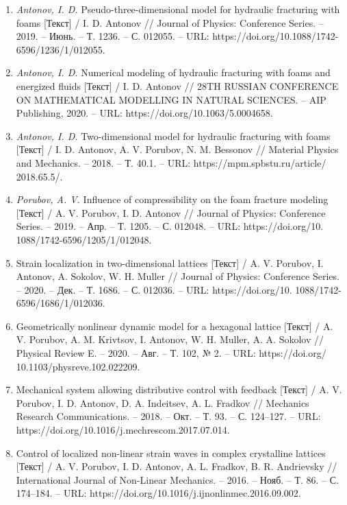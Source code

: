 \begin{enumerate}
\item \textit{Antonov, I. D.} Pseudo-three-dimensional model for hydraulic fracturing with
foams [Текст] / I. D. Antonov // Journal of Physics: Conference Series. --
2019. -- Июнь. -- Т. 1236. -- С. 012055. -- URL: https://doi.org/10.1088/1742-
6596/1236/1/012055.

\item \textit{Antonov, I. D.} Numerical modeling of hydraulic fracturing with foams and
energized fluids [Текст] / I. D. Antonov // 28TH RUSSIAN CONFERENCE
ON MATHEMATICAL MODELLING IN NATURAL SCIENCES. -- AIP
Publishing, 2020. -- URL: https://doi.org/10.1063/5.0004658.

\item \textit{Antonov, I. D.} Two-dimensional model for hydraulic fracturing with foams
[Текст] / I. D. Antonov, A. V. Porubov, N. M. Bessonov // Material Physics
and Mechanics. -- 2018. -- Т. 40.1. -- URL: https://mpm.spbstu.ru/article/
2018.65.5/.

\item \textit{Porubov, A. V.} Influence of compressibility on the foam fracture modeling
[Текст] / A. V. Porubov, I. D. Antonov // Journal of Physics: Conference
Series. -- 2019. -- Апр. -- Т. 1205. -- С. 012048. -- URL: https://doi.org/10.
1088/1742-6596/1205/1/012048.

\item Strain localization in two-dimensional lattices [Текст] / A. V. Porubov,
I. Antonov, A. Sokolov, W. H. Muller // Journal of Physics: Conference
Series. -- 2020. -- Дек. -- Т. 1686. -- С. 012036. -- URL: https://doi.org/10.
1088/1742-6596/1686/1/012036.

\item Geometrically nonlinear dynamic model for a hexagonal lattice [Текст] /
A. V. Porubov, A. M. Krivtsov, I. Antonov, W. H. Muller, A. A. Sokolov //
Physical Review E. -- 2020. -- Авг. -- Т. 102, № 2. -- URL: https://doi.org/
10.1103/physreve.102.022209.

\item Mechanical system allowing distributive control with feedback [Текст] /
A. V. Porubov, I. D. Antonov, D. A. Indeitsev, A. L. Fradkov // Mechanics
Research Communications. -- 2018. -- Окт. -- Т. 93. -- С. 124--127. -- URL:
https://doi.org/10.1016/j.mechrescom.2017.07.014.

\item Control of localized non-linear strain waves in complex crystalline lattices
[Текст] / A. V. Porubov, I. D. Antonov, A. L. Fradkov, B. R. Andrievsky //
International Journal of Non-Linear Mechanics. -- 2016. -- Нояб. -- Т. 86. --
С. 174--184. -- URL: https://doi.org/10.1016/j.ijnonlinmec.2016.09.002.


\end{enumerate}
